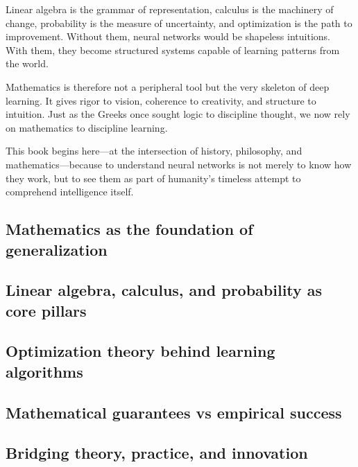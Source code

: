 Linear algebra is the grammar of representation, calculus is the machinery of change, probability is the measure of uncertainty, and optimization is the path to improvement. Without them, neural networks would be shapeless intuitions. With them, they become structured systems capable of learning patterns from the world.

Mathematics is therefore not a peripheral tool but the very skeleton of deep learning. It gives rigor to vision, coherence to creativity, and structure to intuition. Just as the Greeks once sought logic to discipline thought, we now rely on mathematics to discipline learning.

This book begins here—at the intersection of history, philosophy, and mathematics—because to understand neural networks is not merely to know how they work, but to see them as part of humanity’s timeless attempt to comprehend intelligence itself.

\subsection{Mathematics as the foundation of generalization}
\subsection{Linear algebra, calculus, and probability as core pillars}
\subsection{Optimization theory behind learning algorithms}
\subsection{Mathematical guarantees vs empirical success}
\subsection{Bridging theory, practice, and innovation}
